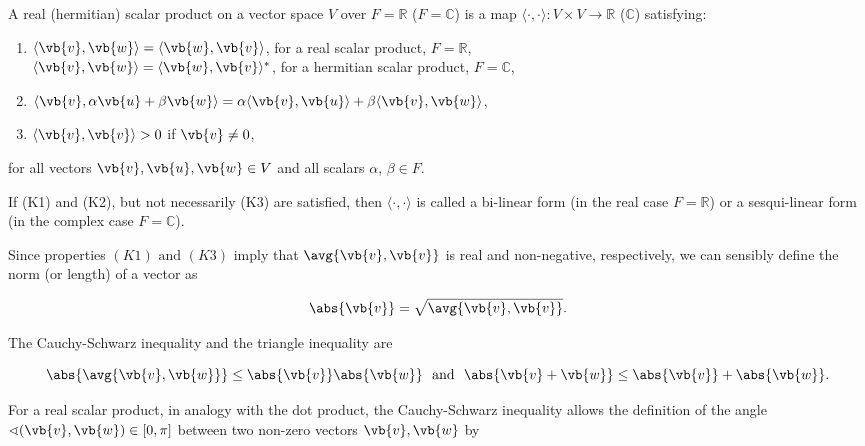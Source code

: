 \documentclass[a4paper,12pt]{report}
\begin{document}
\begin{definition} \label{scalarproduct} 
    A real (hermitian) scalar product on a vector space \( V \) over \( F = \mathbb{R} \) (\( F = \mathbb{C} \)) is a map \(\langle \cdot, \cdot \rangle : V \times V \rightarrow \mathbb{R} \) (\( \mathbb{C} \)) satisfying:
    \begin{enumerate}[label=(\(K\)\arabic*)]
        \item \(\langle \vb{v}, \vb{w} \rangle = \langle \vb{w}, \vb{v} \rangle\), for a real scalar product, \( F = \mathbb{R} \),\\
              \(\langle \vb{v}, \vb{w} \rangle = \langle \vb{w}, \vb{v} \rangle^*\), for a hermitian scalar product, \( F = \mathbb{C} \),
        \item \(\langle \vb{v}, \alpha \vb{u} + \beta \vb{w} \rangle = \alpha \langle \vb{v}, \vb{u} \rangle + \beta \langle \vb{v}, \vb{w} \rangle\),
        \item \(\langle \vb{v}, \vb{v} \rangle > 0\) if \(\vb{v} \neq 0\),
    \end{enumerate}
    for all vectors \(\vb{v}, \vb{u}, \vb{w} \in V\) and all scalars \(\alpha\), \(\beta \in F\).
    
    If (K1) and (K2), but not necessarily (K3) are satisfied, then \(\langle \cdot, \cdot \rangle\) is called a bi-linear form (in the real case \( F = \mathbb{R} \)) or a sesqui-linear form (in the complex case \( F = \mathbb{C} \)).
\end{definition}

Since properties \((K1) \text { and } (K3)\) imply that \(\avg{\vb{v} ,\vb{v} } \) is real and non-negative, respectively, we can sensibly define the norm (or length) of a vector as 

\begin{equation}
    \abs{\vb{v} } = \sqrt{\avg{\vb{v} ,\vb{v} } }.
\end{equation}

The Cauchy-Schwarz inequality and the triangle inequality are 

\begin{equation}
    \abs{\avg{\vb{v} ,\vb{w} } } \le \abs{\vb{v} }\abs{\vb{w} } ~\text { and }~  \abs{\vb{v} + \vb{w} } \le \abs{\vb{v} } + \abs{\vb{w} }.      
\end{equation}

For a real scalar product, in analogy with the dot product, the Cauchy-Schwarz inequality allows the definition of the angle \(\sphericalangle (\vb{v} ,\vb{w} ) \in  [0,\pi ]\) between two non-zero vectors \(\vb{v} ,\vb{w} \) by
\end{document}
